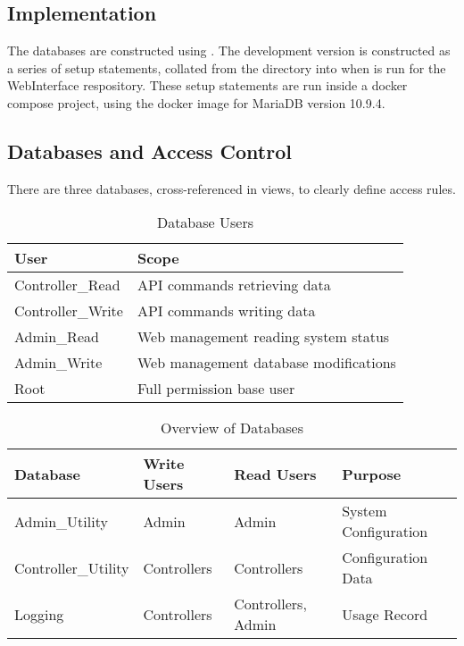 \newenvironment{databaseTable}
    { \begin{table}[H]
        \centering 
        \setlength{\tabcolsep}{8pt}
        \renewcommand{\arraystretch}{1.5} }
    { \end{table} }

\subsection{Implementation}
The databases are constructed using .
The development version is constructed as a series of setup statements,
    collated from the  directory into  when  is run for the WebInterface respository.
These setup statements are run inside a docker compose project,
    using the docker image for MariaDB version 10.9.4.

\subsection{Databases and Access Control}
There are three databases, cross-referenced in views, to clearly define access rules.

\begin{databaseTable}
    \setlength{\tabcolsep}{24pt}
    \caption{Database Users}
    \label{table: database_users}
    \begin{tabular}{l l}
        \toprule
        User & Scope \\
        \midrule
        Controller\_Read & API commands retrieving data \\
        Controller\_Write & API commands writing data \\
        Admin\_Read & Web management reading system status \\
        Admin\_Write & Web management database modifications \\
        Root & Full permission base user \\
        \bottomrule
    \end{tabular}
\end{databaseTable}
\vspace{-1em}
\begin{table}[H]
    \centering
    \setlength{\tabcolsep}{18pt}
    \renewcommand{\arraystretch}{1.5}
    \caption{Overview of Databases}
    \label{table: database_overview}
    \begin{tabular}{l l l l}
        \toprule
        Database & Write Users & Read Users & Purpose \\
        \midrule
        Admin\_Utility & Admin & Admin & System Configuration \\
        Controller\_Utility & Controllers & Controllers & Configuration Data \\
        Logging & Controllers & Controllers, Admin & Usage Record \\
        \bottomrule
    \end{tabular}
\end{table}

